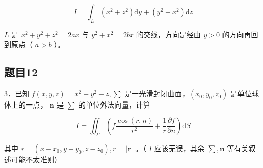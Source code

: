 \documentclass{article}
\begin{document}
\[
I=\int_{L}\left(x^{2}+z^{2}\right) \mathrm{d} y+\left(y^{2}+x^{2}\right) \mathrm{d} z
\]

\(L\) 是 \(x^{2}+y^{2}+z^{2}=2 a x\) 与 \(y^{2}+x^{2}=2 b x\) 的交线，方向是经由 \(y>0\) 的方向再回到原点（ \(a>b\) ）。

\subsection{题目12}
3．已知 \(f(x, y, z)=x^{2}+y^{2}-z, \sum\) 是一光滑封闭曲面，\(\left(x_{0}, y_{0}, z_{0}\right)\) 是单位球体上的一点， \(\mathbf{n}\) 是 \(\sum\) 的单位外法向量，计算

\[
I=\iint_{\Sigma}\left(f \frac{\cos (r, n)}{r^{2}}+\frac{1}{r} \frac{\partial f}{\partial n}\right) \mathrm{d} S
\]

其中 \(r=\left(x-x_{0}, y-y_{0}, z-z_{0}\right), r=|\mathbf{r}|\) 。（ \(I\) 应该无误，其余 \(\sum, \mathbf{n}\) 等有关叙述可能不太准则）
\end{document}
